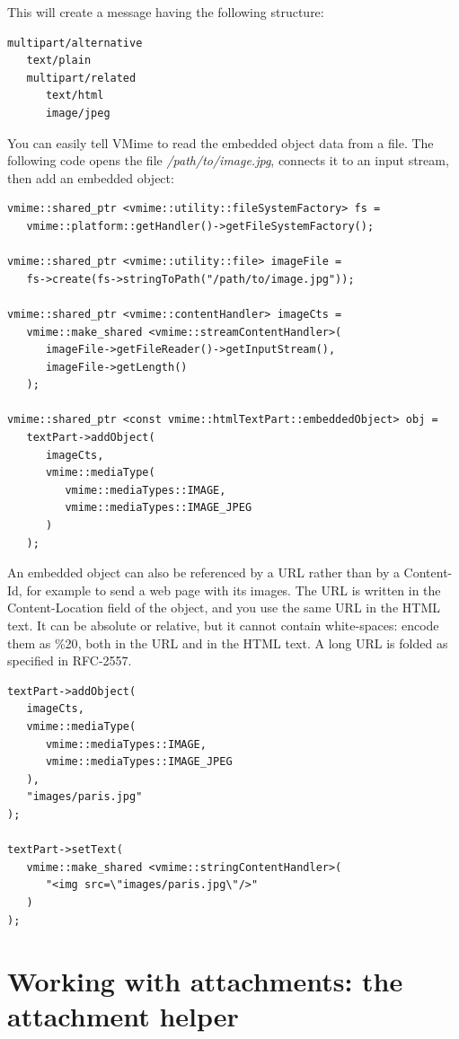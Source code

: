 This will create a message having the following structure:

\begin{verbatim}
multipart/alternative
   text/plain
   multipart/related
      text/html
      image/jpeg
\end{verbatim}

You can easily tell VMime to read the embedded object data from a file. The
following code opens the file \emph{/path/to/image.jpg}, connects it to an
input stream, then add an embedded object:

\begin{lstlisting}
vmime::shared_ptr <vmime::utility::fileSystemFactory> fs =
   vmime::platform::getHandler()->getFileSystemFactory();

vmime::shared_ptr <vmime::utility::file> imageFile =
   fs->create(fs->stringToPath("/path/to/image.jpg"));

vmime::shared_ptr <vmime::contentHandler> imageCts =
   vmime::make_shared <vmime::streamContentHandler>(
      imageFile->getFileReader()->getInputStream(),
      imageFile->getLength()
   );

vmime::shared_ptr <const vmime::htmlTextPart::embeddedObject> obj =
   textPart->addObject(
      imageCts,
      vmime::mediaType(
         vmime::mediaTypes::IMAGE,
         vmime::mediaTypes::IMAGE_JPEG
      )
   );
\end{lstlisting}

An embedded object can also be referenced by a URL rather than by a
Content-Id, for example to send a web page with its images. The URL is
written in the {\vcode Content-Location} field of the object, and you use the
same URL in the HTML text. It can be absolute or relative, but it cannot
contain white-spaces: encode them as {\vcode \%20}, both in the URL and in the
HTML text. A long URL is folded as specified in RFC-2557.

\begin{lstlisting}
textPart->addObject(
   imageCts,
   vmime::mediaType(
      vmime::mediaTypes::IMAGE,
      vmime::mediaTypes::IMAGE_JPEG
   ),
   "images/paris.jpg"
);

textPart->setText(
   vmime::make_shared <vmime::stringContentHandler>(
      "<img src=\"images/paris.jpg\"/>"
   )
);
\end{lstlisting}


\section{Working with attachments: the attachment helper\label{msg-attachment-helper}}

